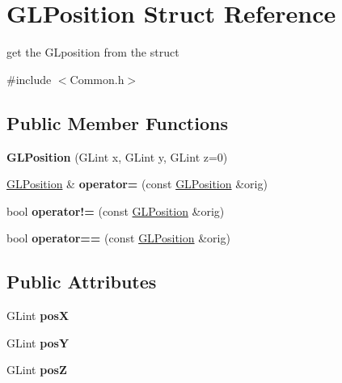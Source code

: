 \hypertarget{structGLPosition}{\section{G\-L\-Position Struct Reference}
\label{structGLPosition}
}


get the G\-Lposition from the struct  




{\ttfamily \#include $<$Common.\-h$>$}

\subsection*{Public Member Functions}
\begin{DoxyCompactItemize}
\item 
\hypertarget{structGLPosition_af1bc843a37986d19db3b497048ca0742}{{\bfseries G\-L\-Position} (G\-Lint x, G\-Lint y, G\-Lint z=0)}\label{structGLPosition_af1bc843a37986d19db3b497048ca0742}

\item 
\hypertarget{structGLPosition_ae678b653b2d3aa648525aab72fec95d6}{\hyperlink{structGLPosition}{G\-L\-Position} \& {\bfseries operator=} (const \hyperlink{structGLPosition}{G\-L\-Position} \&orig)}\label{structGLPosition_ae678b653b2d3aa648525aab72fec95d6}

\item 
\hypertarget{structGLPosition_a96f5cbecf7f65e66a28c36421da65c79}{bool {\bfseries operator!=} (const \hyperlink{structGLPosition}{G\-L\-Position} \&orig)}\label{structGLPosition_a96f5cbecf7f65e66a28c36421da65c79}

\item 
\hypertarget{structGLPosition_a52d0ec6bbc8c0e677d4e16886395025f}{bool {\bfseries operator==} (const \hyperlink{structGLPosition}{G\-L\-Position} \&orig)}\label{structGLPosition_a52d0ec6bbc8c0e677d4e16886395025f}

\end{DoxyCompactItemize}
\subsection*{Public Attributes}
\begin{DoxyCompactItemize}
\item 
\hypertarget{structGLPosition_a282b580759ebed18fc3754d070c12443}{G\-Lint {\bfseries pos\-X}}\label{structGLPosition_a282b580759ebed18fc3754d070c12443}

\item 
\hypertarget{structGLPosition_acea4105d3747c39a6a9feca4c8b1de9b}{G\-Lint {\bfseries pos\-Y}}\label{structGLPosition_acea4105d3747c39a6a9feca4c8b1de9b}

\item 
\hypertarget{structGLPosition_ac54bc083cdad0f7b92337e186c6b6883}{G\-Lint {\bfseries pos\-Z}}\label{structGLPosition_ac54bc083cdad0f7b92337e186c6b6883}

\end{DoxyCompactItemize}


